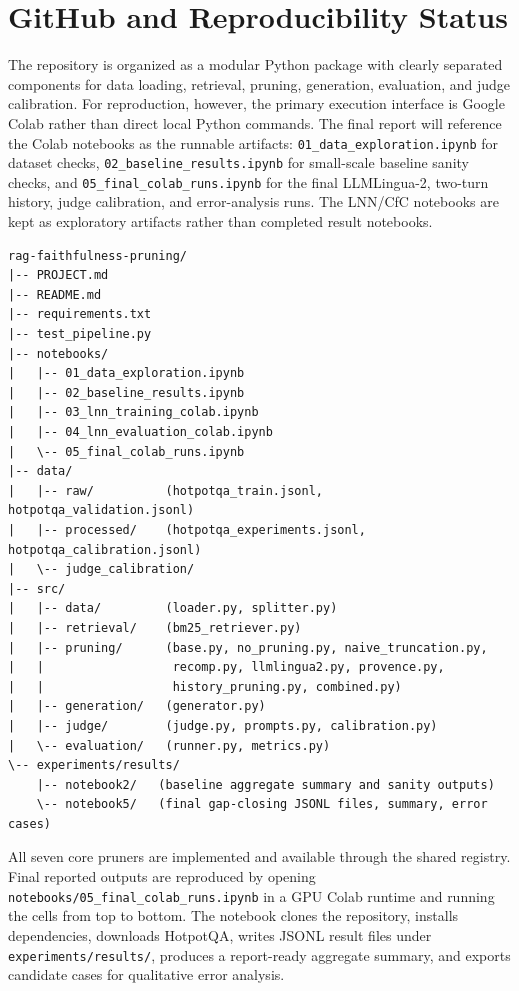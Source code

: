 \documentclass[11pt,a4paper]{article}
\begin{document}
\section{GitHub and Reproducibility Status}

The repository is organized as a modular Python package with clearly separated components for data loading, retrieval, pruning, generation, evaluation, and judge calibration. For reproduction, however, the primary execution interface is Google Colab rather than direct local Python commands. The final report will reference the Colab notebooks as the runnable artifacts: \texttt{01\_data\_exploration.ipynb} for dataset checks, \texttt{02\_baseline\_results.ipynb} for small-scale baseline sanity checks, and \texttt{05\_final\_colab\_runs.ipynb} for the final LLMLingua-2, two-turn history, judge calibration, and error-analysis runs. The LNN/CfC notebooks are kept as exploratory artifacts rather than completed result notebooks.

\begin{verbatim}
rag-faithfulness-pruning/
|-- PROJECT.md
|-- README.md
|-- requirements.txt
|-- test_pipeline.py
|-- notebooks/
|   |-- 01_data_exploration.ipynb
|   |-- 02_baseline_results.ipynb
|   |-- 03_lnn_training_colab.ipynb
|   |-- 04_lnn_evaluation_colab.ipynb
|   \-- 05_final_colab_runs.ipynb
|-- data/
|   |-- raw/          (hotpotqa_train.jsonl, hotpotqa_validation.jsonl)
|   |-- processed/    (hotpotqa_experiments.jsonl, hotpotqa_calibration.jsonl)
|   \-- judge_calibration/
|-- src/
|   |-- data/         (loader.py, splitter.py)
|   |-- retrieval/    (bm25_retriever.py)
|   |-- pruning/      (base.py, no_pruning.py, naive_truncation.py,
|   |                  recomp.py, llmlingua2.py, provence.py,
|   |                  history_pruning.py, combined.py)
|   |-- generation/   (generator.py)
|   |-- judge/        (judge.py, prompts.py, calibration.py)
|   \-- evaluation/   (runner.py, metrics.py)
\-- experiments/results/
    |-- notebook2/   (baseline aggregate summary and sanity outputs)
    \-- notebook5/   (final gap-closing JSONL files, summary, error cases)
\end{verbatim}

All seven core pruners are implemented and available through the shared registry. Final reported outputs are reproduced by opening \texttt{notebooks/05\_final\_colab\_runs.ipynb} in a GPU Colab runtime and running the cells from top to bottom. The notebook clones the repository, installs dependencies, downloads HotpotQA, writes JSONL result files under \texttt{experiments/results/}, produces a report-ready aggregate summary, and exports candidate cases for qualitative error analysis.
\end{document}

